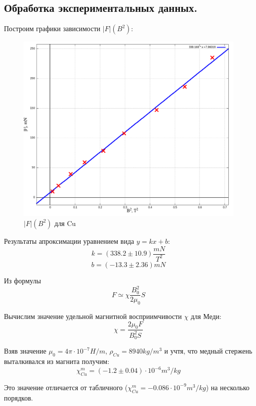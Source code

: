 \documentclass{article}
\begin{document}
    \subsection{Обработка экспериментальных данных.}

    Построим графики зависимости $|F|(B^2)$:

    \begin{figure}[H]
        \centering
        \includegraphics[width=\textwidth]{Cu-comp.png}
        \caption{$|F|(B^2)$ для Cu}
    \end{figure}

    Результаты апроксимации уравнением вида \(y = kx + b\):
    \[ k = (338.2 \pm 10.9) \frac{mN}{T^2} \]
    \[ b = (-13.3 \pm 2.36) mN \]

    Из формулы
    \[ F \simeq \chi\frac{B_0^2}{2\mu_0}S \]

    Вычислим значение удельной магнитной восприимчивости \(\chi\) для Меди:
    \[ \chi = \frac{2\mu_0F}{B_0^2S} \]

    Взяв значение \( \mu_0 = 4\pi \cdot 10^{-7} H/m \), \( \rho_{Cu} = 8940 kg/m^3 \) и учтя, что медный стержень
    выталкивался из магнита получим:
    \[ \chi^{m}_{Cu} = (-1.2 \pm 0.04) \cdot 10^{-6} m^3/kg \]

    Это значение отличается от табличного (\( \chi^m_{Cu} = -0.086 \cdot 10^{-9} m^3/kg \)) на несколько порядков.
\end{document}
